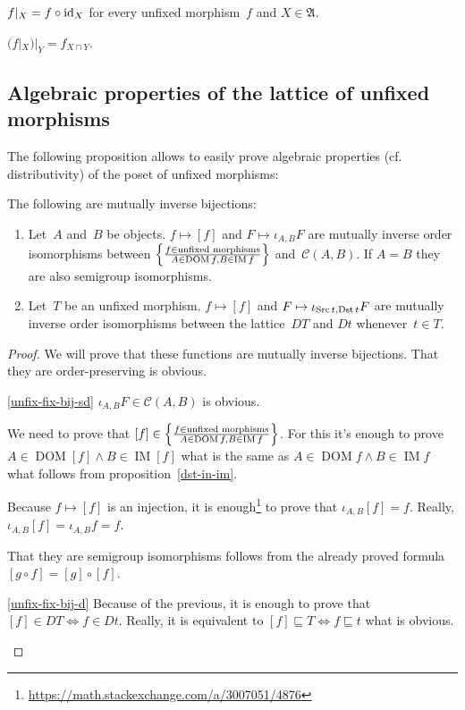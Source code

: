 \begin{defn}
$f|_X=f\circ\operatorname{id}_X$ for every unfixed morphism~$f$ and
$X\in\mathfrak{A}$.
\end{defn}

\begin{obvious}
$(f|_X)|_Y=f_{X\sqcap Y}$.
\end{obvious}

\subsection{Algebraic properties of the lattice of unfixed
morphisms}

The following proposition allows to easily prove algebraic
properties (cf. distributivity) of the poset of unfixed morphisms:

\begin{thm}\label{unfix-fix-bij}
The following are mutually inverse bijections:
\begin{enumerate}
\item\label{unfix-fix-bij-sd} Let~$A$ and~$B$ be objects. $f\mapsto[f]$ and $F\mapsto\iota_{A,B}F$
are mutually inverse order isomorphisms between
$\left\{ \frac{f\in\text{unfixed morphisms}}{A\in\operatorname{DOM}f,B\in\operatorname{IM}f}\right\}$
and~$\mathcal{C}(A,B)$.
If $A=B$ they are also semigroup isomorphisms.
\item\label{unfix-fix-bij-d} Let~$T$ be an unfixed morphism. $f\mapsto[f]$ and $F\mapsto\iota_{\operatorname{Src} t,\operatorname{Dst} t}F$ are mutually inverse order isomorphisms
between the lattice~$DT$ and $Dt$ whenever~$t\in T$.
\end{enumerate}
\end{thm}

\begin{proof}
We will prove that these functions are mutually inverse
bijections. That they are order-preserving is obvious.
\begin{widedisorder}
\item[\ref{unfix-fix-bij-sd}]
$\iota_{A,B}F\in\mathcal{C}(A,B)$ is obvious.

We need to prove that
$[f]\in\left\{ \frac{f\in\text{unfixed morphisms}}{A\in\operatorname{DOM}f,B\in\operatorname{IM}f}\right\}$.
For this it's enough to prove
$A\in\operatorname{DOM}[f]\land B\in\operatorname{IM}[f]$
what is the same as
$A\in\operatorname{DOM}f\land B\in\operatorname{IM}f$
what follows from proposition~\ref{dst-in-im}.

Because $f\mapsto[f]$ is an injection, it is
enough\footnote{\url{https://math.stackexchange.com/a/3007051/4876}}
to prove that 
$\iota_{A,B}[f]=f$. Really, $\iota_{A,B}[f]=\iota_{A,B}f=f$.

That they are semigroup isomorphisms follows from the
already proved formula $[g\circ f]=[g]\circ[f]$.

\item[\ref{unfix-fix-bij-d}]
Because of the previous, it is enough to prove that
$[f]\in DT\Leftrightarrow f\in Dt$. Really, it is equivalent
to $[f]\sqsubseteq T\Leftrightarrow f\sqsubseteq t$
what is obvious.
\end{widedisorder}
\end{proof}

